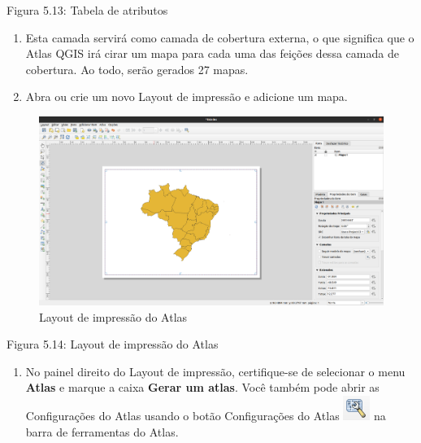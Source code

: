\documentclass[
]{krantz}
\providecommand{\tightlist}{%
  \setlength{\itemsep}{0pt}\setlength{\parskip}{0pt}}
\begin{document}
Figura 5.13: Tabela de atributos

\begin{enumerate}
\def\labelenumi{\arabic{enumi}.}
\item
  Esta camada servirá como camada de cobertura externa, o que significa que o Atlas QGIS irá cirar um mapa para cada uma das feições dessa camada de cobertura. Ao todo, serão gerados 27 mapas.
\item
  Abra ou crie um novo Layout de impressão e adicione um mapa.
\end{enumerate}

\begin{figure}
\centering
\includegraphics{media/modulo5/atlas-print-layout.png}
\caption{Layout de impressão do Atlas}
\end{figure}

Figura 5.14: Layout de impressão do Atlas

\begin{enumerate}
\def\labelenumi{\arabic{enumi}.}
\setcounter{enumi}{2}
\tightlist
\item
  No painel direito do Layout de impressão, certifique-se de selecionar o menu \textbf{Atlas} e marque a caixa \textbf{Gerar um atlas}. Você também pode abrir as Configurações do Atlas usando o botão Configurações do Atlas \includegraphics{media/modulo5/atlas-settings-btn.png} na barra de ferramentas do Atlas.
\end{enumerate}
\end{document}
